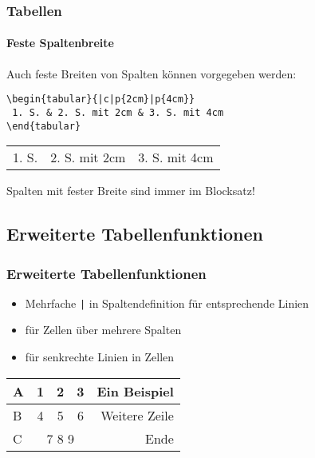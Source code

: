 \begin{frame}[fragile]
\frametitle{Tabellen}
\framesubtitle{Feste Spaltenbreite}
Auch feste Breiten von Spalten können vorgegeben werden:
\begin{codeblock}
\begin{verbatim}
\begin{tabular}{|c|p{2cm}|p{4cm}}
 1. S. & 2. S. mit 2cm & 3. S. mit 4cm
\end{tabular}
\end{verbatim}
\end{codeblock}
\pause\bigskip
    \begin{table}
    \center

    \begin{tabular}{|c|p{2cm}|p{4cm}}
      1. S. & 2. S. mit 2cm & 3. S. mit 4cm
    \end{tabular}
    \end{table}\pause
    \medskip

    Spalten mit fester Breite sind immer im Blocksatz!
\end{frame}

\subsection{Erweiterte Tabellenfunktionen}

\begin{frame}[fragile]
\frametitle{Erweiterte Tabellenfunktionen}
\begin{itemize}
    \item Mehrfache \verb+|+ in Spaltendefinition für entsprechende Linien \pause
    \item {} für Zellen über mehrere Spalten\pause
    \item {} für senkrechte Linien in Zellen
\end{itemize}

\pause
\begin{table}
\center
  \begin{tabular}{|l||*{3}{c|}|r|}
   \hline
    A & 1 & 2 & 3 & Ein \vline Beispiel \\\hline
    B & 4 & 5 & 6 & Weitere Zeile \\\hline \hline
    C & \multicolumn{3}{c||}{7 8 9} & Ende \\\hline
  \end{tabular}
  \end{table}
\end{frame}


